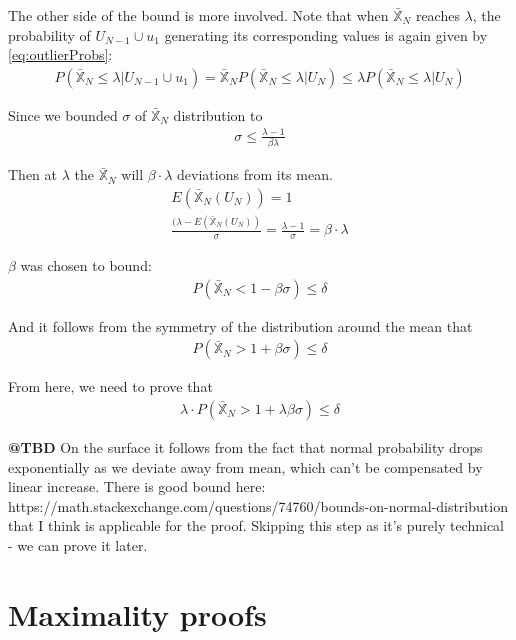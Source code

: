 \documentclass[11pt]{article}
\begin{document}
 The other side of the bound is more involved.  Note that when $ \bar{\mathbb{X}}_N$ reaches $\lambda$, the probability of $U_{N-1} \cup u_1$ generating its corresponding values is again given by  \eqref{eq:outlierProbs}:
\begin{align}
P \left( \bar{\mathbb{X}}_N \le \lambda |  U_{N-1} \cup u_1 \right)  =  \bar{\mathbb{X}}_N P \left( \bar{\mathbb{X}}_N \le \lambda |  U_N \right) \le \lambda P \left( \bar{\mathbb{X}}_N \le \lambda |  U_N \right)
\end{align}

Since we bounded $\sigma$ of $\bar{\mathbb{X}}_N$ distribution to
\begin{align}
\sigma \le \frac{\lambda - 1}{\beta \lambda}
\end{align}

Then at $\lambda$ the $\bar{\mathbb{X}}_N$ will $\beta \cdot \lambda$ deviations from its mean.
\begin{align}
E(\bar{\mathbb{X}}_N (U_N)) = 1 \\
\frac{(\lambda - E(\bar{\mathbb{X}}_N (U_N))}{\sigma} = \frac{\lambda - 1}{\sigma} = \beta \cdot \lambda
\end{align}

$\beta$ was chosen to bound:
\begin{align}
P(\bar{\mathbb{X}}_N < 1 - \beta \sigma) \le \delta
\end{align}

And it follows from the symmetry of the distribution around the mean that
\begin{align}
P(\bar{\mathbb{X}}_N > 1 + \beta \sigma) \le \delta
\end{align}

From here, we need to prove that 
\begin{align}
\lambda \cdot P(\bar{\mathbb{X}}_N > 1 +  \lambda \beta \sigma) \le \delta
\end{align}

\textbf{@TBD}
On the surface it follows from the fact that normal probability drops exponentially as we deviate away from mean, which can't be compensated by linear increase.   There is good bound here: https://math.stackexchange.com/questions/74760/bounds-on-normal-distribution that I think is applicable for the proof.  Skipping this step as it's purely technical - we can prove it later.

\section{Maximality proofs}
\end{document}
